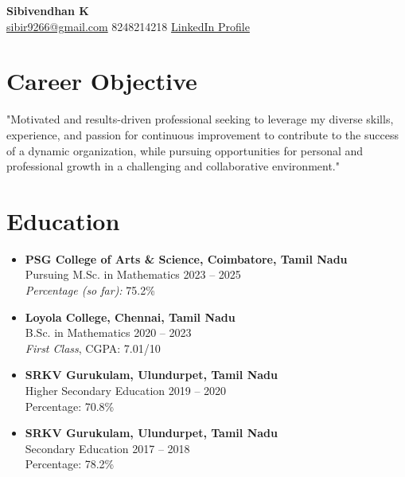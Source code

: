 \documentclass[a4paper,10pt]{article}
\begin{document}
\pagestyle{empty}

\begin{center}
    {\Huge \textbf{Sibivendhan K}} \\
    \vspace{5pt}
    \href{mailto:sibir9266@gmail.com}{sibir9266@gmail.com} \hspace{1cm} 
    8248214218 \hspace{1cm} 
    \href{http://www.linkedin.com/in/sibivendhan-k-a25018293}{LinkedIn Profile}
\end{center}

\vspace{0.5cm}

\section*{Career Objective}
"Motivated and results-driven professional seeking to leverage my diverse skills, experience, and passion for continuous improvement to contribute to the success of a dynamic organization, while pursuing opportunities for personal and professional growth in a challenging and collaborative environment."

\section*{Education}
\begin{itemize}[leftmargin=1.5cm]
    \item \textbf{PSG College of Arts \& Science, Coimbatore, Tamil Nadu} \\
    Pursuing M.Sc. in Mathematics \hfill 2023 -- 2025 \\
    \textit{Percentage (so far):} 75.2\%
    \item \textbf{Loyola College, Chennai, Tamil Nadu} \\
    B.Sc. in Mathematics \hfill 2020 -- 2023 \\
    \textit{First Class}, CGPA: 7.01/10
    \item \textbf{SRKV Gurukulam, Ulundurpet, Tamil Nadu} \\
    Higher Secondary Education \hfill 2019 -- 2020 \\
    Percentage: 70.8\%
    \item \textbf{SRKV Gurukulam, Ulundurpet, Tamil Nadu} \\
    Secondary Education \hfill 2017 -- 2018 \\
    Percentage: 78.2\%
\end{itemize}
\end{document}
